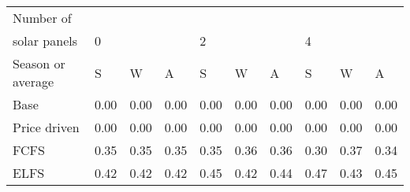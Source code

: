 \begin{table}[h] 
\centering 
\begin{tabular}{l|lll|lll|lll}Number of \\ solar panels&0& & &2& & &4& & \\ \hline 
Season or average & S & W & A & S & W & A & S & W & A \\ \hline 
Base&0.00&0.00&0.00&0.00&0.00&0.00&0.00&0.00&0.00 \\ 
Price driven&0.00&0.00&0.00&0.00&0.00&0.00&0.00&0.00&0.00 \\ 
FCFS&0.35&0.35&0.35&0.35&0.36&0.36&0.30&0.37&0.34 \\ 
ELFS&0.42&0.42&0.42&0.45&0.42&0.44&0.47&0.43&0.45 \\ 
\end{tabular} 
\end{table}